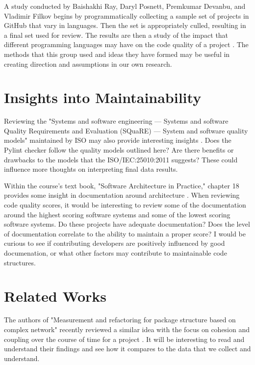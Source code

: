 \documentclass[conference]{IEEEtran}
\begin{document}
A study conducted by Baishakhi Ray, Daryl Posnett, Premkumar Devanbu, and Vladimir Filkov begins by programmatically collecting a sample set of projects in GitHub that vary in languages. Then the set is appropriately culled, resulting in a final set used for review. The results are then a study of the impact that different programming languages may have on the code quality of a project \cite{baishakhi:2017}. The methods that this group used and ideas they have formed may be useful in creating direction and assumptions in our own research.

\section{Insights into Maintainability}

Reviewing the "Systems and software engineering — Systems and software Quality Requirements and Evaluation (SQuaRE) — System and software quality models" maintained by ISO may also provide interesting insights \cite{iso/iec:25010:2011}. Does the Pylint checker follow the quality models outlined here? Are there benefits or drawbacks to the models that the ISO/IEC:25010:2011 suggests? These could influence more thoughts on interpreting final data results.

Within the course's text book, "Software Architecture in Practice," chapter 18 provides some insight in documentation around architecture \cite{book:software-architecture-in-practice}. When reviewing code quality scores, it would be interesting to review some of the documentation around the highest scoring software systems and some of the lowest scoring software systems. Do these projects have adequate documentation? Does the level of documentation correlate to the ability to maintain a proper score? I would be curious to see if contributing developers are positively influenced by good documenation, or what other factors may contribute to maintainable code structures.

\section{Related Works}

The authors of "Measurement and refactoring for package structure based on complex network" recently reviewed a similar idea with the focus on cohesion and coupling over the course of time for a project \cite{zhou:2020}. It will be interesting to read and understand their findings and see how it compares to the data that we collect and understand.
\end{document}

